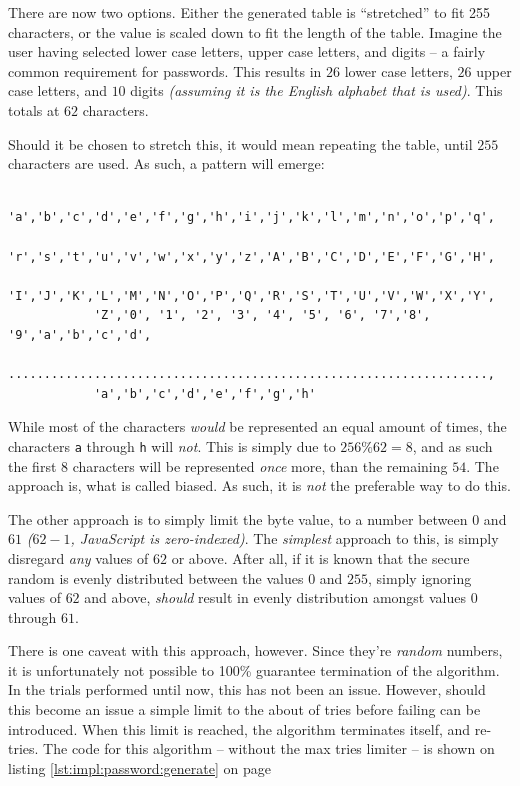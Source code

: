		There are now two options. Either the generated table is ``stretched'' to fit 255 characters, or the value is scaled down to fit the length of the table. Imagine the user having selected lower case letters, upper case letters, and digits -- a fairly common requirement for passwords. This results in $26$ lower case letters, $26$ upper case letters, and $10$ digits \emph{(assuming it is the English alphabet that is used)}. This totals at $62$ characters.

		Should it be chosen to stretch this, it would mean repeating the table, until $255$ characters are used. As such, a pattern will emerge:
		\begin{verbatim}
			'a','b','c','d','e','f','g','h','i','j','k','l','m','n','o','p','q',
			'r','s','t','u','v','w','x','y','z','A','B','C','D','E','F','G','H',
			'I','J','K','L','M','N','O','P','Q','R','S','T','U','V','W','X','Y',
			'Z','0', '1', '2', '3', '4', '5', '6', '7','8', '9','a','b','c','d',
			...................................................................,
			'a','b','c','d','e','f','g','h'
		\end{verbatim}
		While most of the characters \emph{would} be represented an equal amount of times, the characters \verb=a= through \verb=h= will \emph{not}. This is simply due to $256\%62=8$, and as such the first $8$ characters will be represented \emph{once} more, than the remaining $54$. The approach is, what is called biased. As such, it is \emph{not} the preferable way to do this.

		The other approach is to simply limit the byte value, to a number between $0$ and $61$ \emph{($62-1$, JavaScript is zero-indexed)}. The \emph{simplest} approach to this, is simply disregard \emph{any} values of $62$ or above. After all, if it is known that the secure random is evenly distributed between the values $0$ and $255$, simply ignoring values of $62$ and above, \emph{should} result in evenly distribution amongst values $0$ through $61$. 

		There is one caveat with this approach, however. Since they're \emph{random} numbers, it is unfortunately not possible to 100\% guarantee termination of the algorithm. In the trials performed until now, this has not been an issue. However, should this become an issue a simple limit to the about of tries before failing can be introduced. When this limit is reached, the algorithm terminates itself, and re-tries. The code for this algorithm -- without the max tries limiter -- is shown on listing \ref{lst:impl:password:generate} on page \pageref{lst:impl:password:generate}


